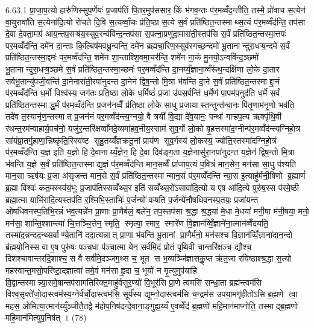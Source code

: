 6.63.1
प्रा॒जा॒प॒त्यो हारु॑णिस्सुप॒र्णेयः॑ प्र॒जाप॑तिं पि॒तर॒मुप॑ससार॒ किं भ॑गव॒न्तः प॑र॒मव्वँ॑द॒न्तीति॒ तस्मै॒ प्रो॑वाच स॒त्येन॑ वा॒युरावा॑ति स॒त्येना॑दि॒त्यो रो॑चते दि॒वि स॒त्यव्वाँ॒चः प्र॑ति॒ष्ठा स॒त्ये स॒र्वं प्रति॑ष्ठित॒न्तस्माथ्स॒त्यं प॑र॒मव्वँद॑न्ति॒ तप॑सा दे॒वा दे॒वता॒मग्र॑ आय॒न्तप॒सऱ्ष॑य॒स्सुव॒रन्व॑विन्द॒न्तप॑सा स॒पत्ना॒प्रणु॑दा॒मारा॑ती॒स्तप॑सि स॒र्वं प्रति॑ष्ठित॒न्तस्मा॒त्तपः॑ पर॒मव्वँद॑न्ति॒ दमे॑न दा॒न्ताः कि॒ल्बिष॑मवधू॒न्वन्ति॒ दमे॑न ब्रह्मचा॒रिण॒स्सुव॑रगच्छ॒न्दमो॑ भू॒तानान्दुरा॒धऱ्ष॒न्दमे॑ स॒र्वं प्रति॑ष्ठित॒न्तस्मा॒द्दमः॑ पर॒मव्वँद॑न्ति॒ शमे॑न शा॒न्ताश्शि॒वमा॒चर॑न्ति॒ शमे॑न ना॒कं मु॒नयो॒ऽन्ववि॑न्द॒ञ्छमो॑ भू॒तानान्दुरा॒धऱ्ष॒ञ्छमे॑ स॒र्वं प्रति॑ष्ठित॒न्तस्मा॒च्छमः॑ पर॒मव्वँद॑न्ति दा॒नय्यँ॒ज्ञाना॒व्वँरू॑थ॒न्दक्षि॑णा लो॒के दा॒तार सर्वभू॒तान्यु॑पजी॒वन्ति॑ दा॒नेनारा॑ती॒रपा॑नुदन्त दा॒नेन॑ द्विष॒न्तो मि॒त्रा भ॑वन्ति दा॒ने स॒र्वं प्रति॑ष्ठित॒न्तस्माद्दा॒नं प॑र॒मव्वँद॑न्ति ध॒र्मो विश्व॑स्य॒ जग॑तः प्रति॒ष्ठा लो॒के ध॒र्मिष्ठं॑ प्र॒जा उ॑पस॒र्पन्ति॑ ध॒र्मेण॑ पा॒पम॑प॒नुद॑ति ध॒र्मे स॒र्वं प्रति॑ष्ठित॒न्तस्माद्ध॒र्मं प॑र॒मव्वँद॑न्ति प्र॒जन॑न॒व्वैँ प्र॑ति॒ष्ठा लो॒के सा॒धु प्र॒जायास्त॒न्तुन्त॑न्वा॒नः पि॑तृ॒णाम॑नृ॒णो भव॑ति॒ तदे॑व त॒स्यानृ॑ण॒न्तस्मात् प्र॒जन॑नं पर॒मव्वँद॑न्त्य॒ग्नयो॒ वै त्रयी॑ वि॒द्या दे॑व॒यानः॒ पन्था॑ गाऱ्हप॒त्य ऋक्पृ॑थि॒वी र॑थन्त॒रम॑न्वाहार्य॒पच॑नो॒ यजु॑र॒न्तरि॑क्षव्वाँमदे॒व्यमा॑हव॒नीय॒स्साम॑ सुव॒र्गो लो॒को बृ॒हत्तस्मा॑द॒ग्नीन्प॑र॒मव्वँद॑न्त्यग्निहो॒त्र सा॑यंप्रा॒तर्गृ॒हाणा॒न्निष्कृ॑ति॒स्स्वि॑ष्ट सुहु॒तय्यँ॑ज्ञक्रतू॒नां प्राय॑ण सुव॒र्गस्य॑ लो॒कस्य॒ ज्योति॒स्तस्मा॑दग्निहो॒त्रं प॑र॒मव्वँद॑न्ति य॒ज्ञ इति॑ य॒ज्ञो हि दे॒वानाय्यँ॒ज्ञेन॒ हि दे॒वा दिव॑ङ्ग॒ता य॒ज्ञेनासु॑रा॒नपा॑नुदन्त य॒ज्ञेन॑ द्विष॒न्तो मि॒त्रा भ॑वन्ति य॒ज्ञे स॒र्वं प्रति॑ष्ठित॒न्तस्माद्य॒ज्ञं प॑र॒मव्वँद॑न्ति मान॒सव्वैँ प्रा॑जाप॒त्यं प॒वित्रं॑ मान॒सेन॒ मन॑सा सा॒धु प॑श्यति मान॒सा ऋष॑यः प्र॒जा अ॑सृजन्त मान॒से स॒र्वं प्रति॑ष्ठित॒न्तस्मान्मान॒सं प॑र॒मव्वँद॑न्ति न्या॒स इ॒त्याहु॑र्मनी॒षिणो ब्र॒ह्माणं॑ ब्र॒ह्मा विश्वः॑ कत॒मस्स्व॑यं॒भुः प्र॒जाप॑तिस्सव्वँथ्स॒र इति॑ सव्वँथ्स॒रो॑ऽसावा॑दि॒त्यो य ए॒ष आ॑दि॒त्ये पुरु॑ष॒स्स प॑रमे॒ष्ठी ब्रह्मा॒त्मा याभि॑रादि॒त्यस्तप॑ति र॒श्मिभि॒स्ताभिः॑ प॒र्जन्यो॑ वऱ्षति प॒र्जन्ये॑नौषधिवनस्प॒तयः॒ प्रजा॑यन्त ओषधिवनस्प॒तिभि॒रन्नं॑ भव॒त्यन्ने॑न प्रा॒णाः प्रा॒णैर्बलं॒ बले॑न॒ तप॒स्तप॑सा श्र॒द्धा श्र॒द्धया॑ मे॒धा मे॒धया॑ मनी॒षा म॑नी॒षया॒ मनो॒ मन॑सा॒ शान्ति॒श्शान्त्या॑ चि॒त्तञ्चि॒त्तेन॒ स्मृति॒ स्मृत्या॒ स्मार॒ स्मारे॑ण वि॒ज्ञान॑व्विँ॒ज्ञाने॑ना॒त्मान॑व्वेँदयति॒ तस्मा॑द॒न्नन्दद॒न्थ्सर्वाण्ये॒तानि॑ ददा॒त्यन्नात् प्रा॒णा भ॑वन्ति भू॒तानां प्रा॒णैर्मनो॒ मन॑सश्च वि॒ज्ञान॑व्विँ॒ज्ञाना॑दान॒न्दो ब्र॑ह्मयो॒निस्स वा ए॒ष पुरु॑षः पञ्च॒धा प॑ञ्चा॒त्मा येन॒ सर्व॑मि॒दं प्रोतं॑ पृथि॒वी चा॒न्तरि॑क्षञ्च॒ द्यौश्च॒ दिश॑श्चावान्तरदि॒शाश्च॒ स वै सर्व॑मि॒दञ्जग॒थ्स च॒ भूत स भ॒व्यञ्जि॑ज्ञासकॢ॒प्त ऋ॑त॒जा रयि॑ष्ठाश्श्र॒द्धा स॒त्यो मह॑स्वान्त॒मसो॒परि॑ष्टा॒द्ज्ञात्वा॑ तमे॒वं मन॑सा हृ॒दा च॒ भूयो॑ न मृ॒त्युमुप॑याहि वि॒द्वान्तस्मान्न्या॒समे॒षान्तप॑सामतिरिक्त॒माहु॑र्वसुर॒ण्यो॑ वि॒भूर॑सि प्रा॒णे त्वमसि॑ सन्धा॒ता ब्रह्म॑न्त्वम॑सि विश्व॒सृक्ते॑जो॒दास्त्वम॑स्य॒ग्नेर्व॑र्चो॒दास्त्वम॑सि॒ सूर्य॑स्य द्युम्नो॒दास्त्वम॑सि च॒न्द्रम॑स उपया॒मगृ॑हीतोऽसि ब्र॒ह्मणे त्वा॒ महस॒ ओमित्या॒त्मान॑य्युँञ्जीतै॒तद्वै म॑होप॒निष॑दन्दे॒वाना॒ङ्गुह्य॒य्यँ ए॒वव्वेँद॑ ब्र॒ह्मणो॑ महि॒मान॑माप्नोति॒ तस्माद्ब्र॒ह्मणो॑ महि॒मान॑मित्युप॒निष॑त् । (78)
\anuvakamend

